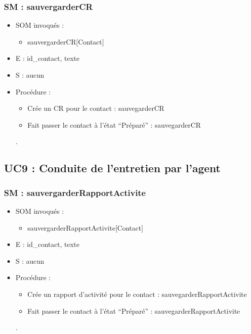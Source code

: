 \subsubsection{SM : sauvergarderCR}
\begin{itemize}
	\item SOM invoqués :
	\begin{itemize}
		\item sauvergarderCR[Contact]
	\end{itemize}
	\item E : id\_contact, texte
	\item S : aucun
	\item Procédure :
	\begin{itemize}
		\item Crée un CR pour le contact : sauvegarderCR
		\item Fait passer le contact à l’état “Préparé” : sauvegarderCR
	\end{itemize}.
\end{itemize}



\subsection{UC9 : Conduite de l’entretien par l’agent}
\subsubsection{SM : sauvergarderRapportActivite}
\begin{itemize}
	\item SOM invoqués :
	\begin{itemize}
		\item sauvergarderRapportActivite[Contact]
	\end{itemize}
	\item E : id\_contact, texte
	\item S : aucun
	\item Procédure :
	\begin{itemize}
		\item Crée un rapport d’activité pour le contact :
	sauvegarderRapportActivite
		\item Fait passer le contact à l’état “Préparé” : sauvegarderRapportActivite
	\end{itemize}.
\end{itemize}

